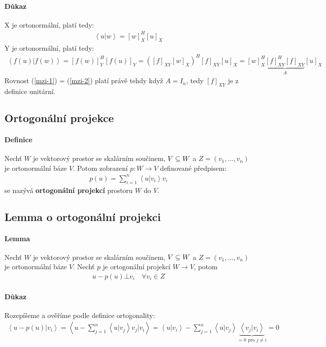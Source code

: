 \documentclass[a4paper,10pt]{article}
\begin{document}
\paragraph{Důkaz}
X je ortonormální, platí tedy:
\begin{align}
	\label{mzi-1}\left< u | w \right> = [w]_X^H[u]_X
\end{align}
Y je ortonormální, platí tedy:
\begin{align}
	\label{mzi-2}\left< f(u) | f(w) \right> = [f(w)]_Y^H[f(u)]_Y =
	([f]_{XY}[w]_X)^H [f]_{XY} [u]_X = [w]_X^H \underbrace{[f]_{XY}^H[f]_{XY}}_A[u]_X
\end{align}
Rovnost (\ref{mzi-1}) = (\ref{mzi-2}) platí právě tehdy když $A = I_n$, tedy
$[f]_{XY}$ je z definice unitární.

\subsection{Ortogonální projekce}
\setcounter{equation}{0}
\paragraph{Definice}
Nechť $W$ je vektorový prostor se skalárním součinem, $V \subseteq W$ a $Z = (v_1,
..., v_n)$ je ortonormální báze $V$. Potom zobrazení $p: W \to V$ definované
předpisem:
\begin{align*}
	p(u) = \sum_{i=1}^n \left< u | v_i \right> v_i
\end{align*}
se nazývá \textbf{ortogonální projekcí} prostoru $W$ do $V$.

\subsection{Lemma o ortogonální projekci}
\setcounter{equation}{0}
\paragraph{Lemma}
Nechť $W$ je vektorový prostor se skalárním součinem, $V \subseteq W$ a $Z = (v_1,
..., v_n)$ je ortonormální báze $V$. Nechť $p$ je ortogonální projekcí $W \to V$, potom 
\begin{align*}
	u - p(u) \bot v_i \quad \forall v_i \in Z
\end{align*}
\paragraph{Důkaz}
Rozepíšeme a ověříme podle definice ortogonality:
\begin{align}
	\left< u - p(u) | v_i \right> = \left< u - \sum_{j=1}^n \left<u|v_j\right>
	v_j \Big| v_i \right> = \left<u | v_i\right> - \sum_{j=1}^n
	\left<u|v_j\right> \underbrace{\left<v_j | v_i \right>}_{=0 \text{ pro }
	j\neq i} = 0
\end{align}
\end{document}

